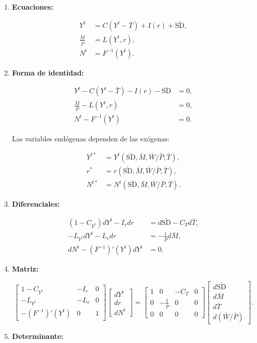 \documentclass[
  doc,
  floatsintext,
  longtable,
  a4paper,
  nolmodern,
  notxfonts,
  notimes,
  colorlinks=true,linkcolor=blue,citecolor=blue,urlcolor=blue]{apa7}
\begin{document}
\begin{enumerate}
\def\labelenumi{\arabic{enumi}.}
\item
  \textbf{Ecuaciones:}

  \[
  \begin{aligned}
  Y^t &= C(Y^t - \bar{T}) + I(r) + \bar{\mathrm{SD}}, \\
  \frac{\bar{M}}{\bar{P}} &= L(Y^t, r), \\
  N^t &= F^{-1}(Y^t).
  \end{aligned}
  \]
\item
  \textbf{Forma de identidad:}

  \[
  \begin{aligned}
  Y^t - C(Y^t - \bar{T}) - I(r) - \bar{\mathrm{SD}} &= 0, \\
  \frac{\bar{M}}{\bar{P}} - L(Y^t, r) &= 0, \\
  N^t - F^{-1}(Y^t) &= 0.
  \end{aligned}
  \]

  Las variables endógenas dependen de las exógenas:

  \[
  \begin{aligned}
  Y^{t*} &= Y^t(\bar{\mathrm{SD}}, \bar{M}, \bar{W}/\bar{P}, \bar{T}), \\
  r^* &= r(\bar{\mathrm{SD}}, \bar{M}, \bar{W}/\bar{P}, \bar{T}), \\
  N^{t*} &= N^t(\bar{\mathrm{SD}}, \bar{M}, \bar{W}/\bar{P}, \bar{T}).
  \end{aligned}
  \]
\item
  \textbf{Diferenciales:}

  \[
  \begin{aligned}
  (1 - C_{Y^t}) dY^t - I_r dr &= d\bar{\mathrm{SD}} - C_T d\bar{T}, \\
  -L_{Y^t} dY^t - L_r dr &= -\frac{1}{\bar{P}} d\bar{M}, \\
  dN^t - (F^{-1})'(Y^t) dY^t &= 0.
  \end{aligned}
  \]
\item
  \textbf{Matriz:}

  \[
  \begin{bmatrix}
  1 - C_{Y^t} & -I_r & 0 \\
  -L_{Y^t} & -L_r & 0 \\
  -(F^{-1})'(Y^t) & 0 & 1
  \end{bmatrix}
  \begin{bmatrix}
  dY^t \\
  dr \\
  dN^t
  \end{bmatrix}
  =
  \begin{bmatrix}
  1 & 0 & -C_T & 0 \\
  0 & -\frac{1}{\bar{P}} & 0 & 0 \\
  0 & 0 & 0 & 0
  \end{bmatrix}
  \begin{bmatrix}
  d\bar{\mathrm{SD}} \\
  d\bar{M} \\
  d\bar{T} \\
  d(\bar{W}/\bar{P})
  \end{bmatrix}.
  \]
\item
  \textbf{Determinante:}


\end{enumerate}
\end{document}
